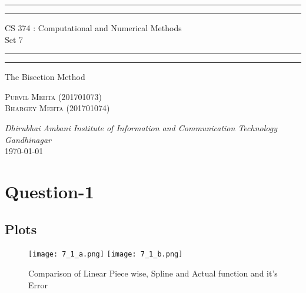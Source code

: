 \documentclass{article}
\begin{document}
\begin{titlepage}
	\centering 
	\scshape
	\vspace*{\baselineskip}
	\rule{\textwidth}{1.6pt}\vspace*{-\baselineskip}\vspace*{2pt}
	\rule{\textwidth}{0.4pt} 
	\vspace{0.75\baselineskip}
	
	{\Large CS 374 : Computational and Numerical Methods \\\vspace{0.75\baselineskip} Set 7}
	\vspace{0.75\baselineskip}
	
	\rule{\textwidth}{0.4pt}\vspace*{-\baselineskip}\vspace{3.2pt} 
	\rule{\textwidth}{1.6pt}
	
	\vspace{2\baselineskip}  
	The Bisection Method
	
	\vspace*{3\baselineskip}
	
	\vspace{0.5\baselineskip} %
	
	{\scshape\large Purvil Mehta (201701073) \\ Bhargey Mehta (201701074) \\} 
	
	\vspace{1\baselineskip} 
	
	\textit{Dhirubhai Ambani Institute of Information and Communication Technology \\ Gandhinagar\\} 
	\vspace*{2\baselineskip}
	\today


\end{titlepage}

\newpage
\tableofcontents
\newpage
\section{Question-1}
\subsection{Plots}
\begin{figure}[!h]
\centering
\texttt{[image: 7\_1\_a.png]}
\texttt{[image: 7\_1\_b.png]}
\caption{Comparison of Linear Piece wise, Spline and Actual function and it's Error}
\end{figure}
\newpage
\end{document}
